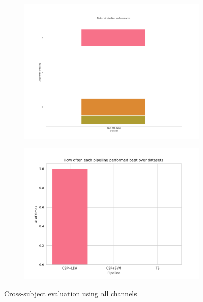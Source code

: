 \begin{figure}
    \begin{subfigure}[h]{0.45\textwidth}
        \includegraphics[width=\textwidth]{./CrossSubjectEvaluation_/ordering.pdf}
    \end{subfigure}
    \begin{subfigure}[h]{0.45\textwidth}
        \includegraphics[width=\textwidth]{./CrossSubjectEvaluation_/summary.pdf}
    \end{subfigure}
    \caption{Cross-subject evaluation using all channels}
\end{figure}
